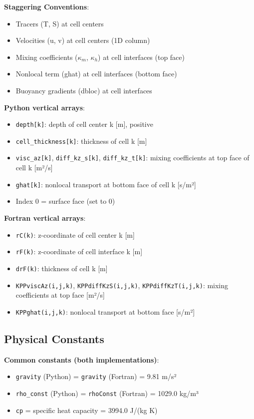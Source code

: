 \documentclass[11pt]{article}
\begin{document}
\textbf{Staggering Conventions}:
\begin{itemize}
    \item Tracers (T, S) at cell centers
    \item Velocities (u, v) at cell centers (1D column)
    \item Mixing coefficients ($\kappa_m$, $\kappa_h$) at cell interfaces (top face)
    \item Nonlocal term (ghat) at cell interfaces (bottom face)
    \item Buoyancy gradients (dbloc) at cell interfaces
\end{itemize}

\textbf{Python vertical arrays}:
\begin{itemize}
    \item \verb|depth[k]|: depth of cell center k [m], positive
    \item \verb|cell_thickness[k]|: thickness of cell k [m]
    \item \verb|visc_az[k]|, \verb|diff_kz_s[k]|, \verb|diff_kz_t[k]|: mixing coefficients at top face of cell k [m²/s]
    \item \verb|ghat[k]|: nonlocal transport at bottom face of cell k [s/m²]
    \item Index 0 = surface face (set to 0)
\end{itemize}

\textbf{Fortran vertical arrays}:
\begin{itemize}
    \item \verb|rC(k)|: z-coordinate of cell center k [m]
    \item \verb|rF(k)|: z-coordinate of cell interface k [m]
    \item \verb|drF(k)|: thickness of cell k [m]
    \item \verb|KPPviscAz(i,j,k)|, \verb|KPPdiffKzS(i,j,k)|, \verb|KPPdiffKzT(i,j,k)|: mixing coefficients at top face [m²/s]
    \item \verb|KPPghat(i,j,k)|: nonlocal transport at bottom face [s/m²]
\end{itemize}

\subsection{Physical Constants}

\textbf{Common constants (both implementations)}:
\begin{itemize}
    \item \verb|gravity| (Python) = \verb|gravity| (Fortran) = 9.81 m/s²
    \item \verb|rho_const| (Python) = \verb|rhoConst| (Fortran) = 1029.0 kg/m³
    \item \verb|cp| = specific heat capacity = 3994.0 J/(kg K)
\end{itemize}
\end{document}
